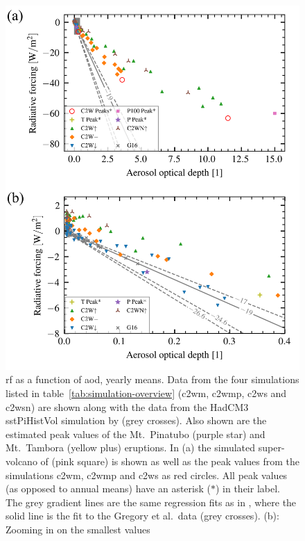 \documentclass{ametsocV6.1}
\begin{document}
\begin{figure}
  \centering
  \includegraphics[width=0.95\linewidth]{figures/aod_vs_toa_avg.png}

  \caption{\gls{rf} as a function of \gls{aod}, yearly means. Data from the four
    simulations listed in table~\ref{tab:simulation-overview} (\gls{c2wm}, \gls{c2wmp},
    \gls{c2ws} and \gls{c2wsn}) are shown along with the data from the HadCM3 sstPiHistVol
    simulation by \citet{gregory2016} (grey crosses). Also shown are the estimated peak
    values of the Mt.\ Pinatubo (purple star) and Mt.\ Tambora (yellow plus) eruptions. In
    (a) the simulated super-volcano of \citet{jones2005} (pink square) is shown as well as
    the peak values from the simulations \gls{c2wm}, \gls{c2wmp} and \gls{c2ws} as red
    circles. All peak values (as opposed to annual means) have an asterisk (\(\ast{}\)) in
    their label. The grey gradient lines are the same regression fits as in \citet[][Fig.\
      4]{gregory2016}, where the solid line is the fit to the Gregory et al.\ data (grey
    crosses). (b): Zooming in on the smallest values}\label{fig:aod_vs_toa_ses_avg}%
\end{figure}
\end{document}
